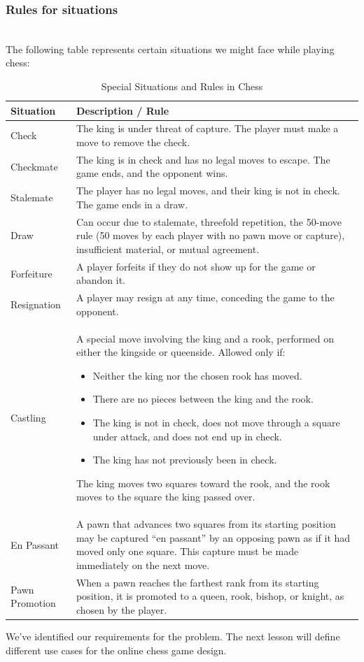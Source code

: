 \subsubsection{Rules for situations}\label{KZamHAF28JI3gYS4kZE55}
\\
The following table represents certain situations we might face while playing chess:

\begin{table}[h!]
\centering
\begin{tabular}{|p{3.5cm}|p{11.5cm}|}
\hline
\textbf{Situation} & \textbf{Description / Rule} \\
\hline
Check &
The king is under threat of capture.
The player must make a move to remove the check. \\
\hline
Checkmate &
The king is in check and has no legal moves to escape.
The game ends, and the opponent wins. \\
\hline
Stalemate &
The player has no legal moves, and their king is not in check.
The game ends in a draw. \\
\hline
Draw &
Can occur due to stalemate, threefold repetition, the 50-move rule
(50 moves by each player with no pawn move or capture), insufficient material,
or mutual agreement. \\
\hline
Forfeiture &
A player forfeits if they do not show up for the game or abandon it. \\
\hline
Resignation &
A player may resign at any time, conceding the game to the opponent. \\
\hline
Castling &
A special move involving the king and a rook, performed on either the
kingside or queenside. Allowed only if:
\begin{itemize}
    \item Neither the king nor the chosen rook has moved.
    \item There are no pieces between the king and the rook.
    \item The king is not in check, does not move through a square under attack,
          and does not end up in check.
    \item The king has not previously been in check.
\end{itemize}
The king moves two squares toward the rook, and the rook moves to the square
the king passed over. \\
\hline
En Passant &
A pawn that advances two squares from its starting position may be captured
``en passant'' by an opposing pawn as if it had moved only one square.
This capture must be made immediately on the next move. \\
\hline
Pawn Promotion &
When a pawn reaches the farthest rank from its starting position, it is promoted
to a queen, rook, bishop, or knight, as chosen by the player. \\
\hline
\end{tabular}
\caption{Special Situations and Rules in Chess}
\label{tab:chess_special_rules}
\end{table}


We've identified our requirements for the problem. The next lesson will define different use cases for the online chess game design.

